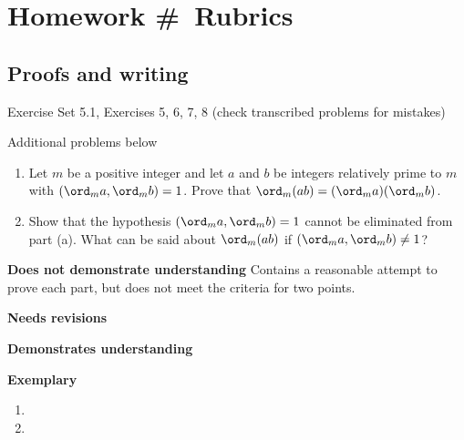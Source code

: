 \documentclass[letterpaper, 11pt]{../ximera}
\begin{document}
\chapter{Homework \#\homework\ Rubrics}

\section*{Proofs and writing}  %
Exercise Set 5.1, Exercises 5, 6, 7, 8 (check transcribed problems for mistakes)

\noindent Additional problems below

\begin{ex} 
	\begin{enumerate}[label=(\alph*)]
 		\item\label{order_mult} Let $m$ be a positive integer and let $a$ and $b$ be integers relatively prime to $m$ with $(\ord_m a, \ord_m b)=1$. Prove that $\ord_m(ab)=(\ord_m a)(\ord_m b)$.
		\item Show that the hypothesis $(\ord_m a, \ord_m b)=1$ cannot be eliminated from part (a). What can be said about $\ord_m(ab)$ if $(\ord_m a, \ord_m b)\neq1$?
	\end{enumerate}
 
\end{ex}	

\begin{writeRubric}
    \item \textbf{Does not demonstrate understanding}
     Contains a reasonable attempt to prove each part, but does not meet the criteria for two points.
    \item \textbf{Needs revisions}
     
    \item \textbf{Demonstrates understanding}
    
    \item \textbf{Exemplary}
        
\end{writeRubric}
                                       	
\begin{solution}
 	\begin{enumerate}[label=(\alph*)]
 		\item
		\item 
	\end{enumerate}

\end{solution}
	
\end{document}
